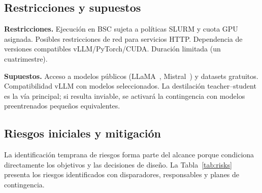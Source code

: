 \documentclass[11pt,a4paper]{article}
\begin{document}
\subsection{Restricciones y supuestos}

\textbf{Restricciones.} Ejecución en BSC sujeta a políticas SLURM y cuota GPU asignada. Posibles restricciones de red para servicios HTTP. Dependencia de versiones compatibles vLLM/PyTorch/CUDA. Duración limitada (un cuatrimestre).

\textbf{Supuestos.} Acceso a modelos públicos (LLaMA~\cite{touvron2023llama}, Mistral~\cite{jiang2023mistral}) y datasets gratuitos. Compatibilidad vLLM con modelos seleccionados. La destilación teacher--student es la vía principal; si resulta inviable, se activará la contingencia con modelos preentrenados pequeños equivalentes.

\subsection{Riesgos iniciales y mitigación}

La identificación temprana de riesgos forma parte del alcance porque condiciona directamente los objetivos y las decisiones de diseño. La Tabla~\ref{tab:risks} presenta los riesgos identificados con disparadores, responsables y planes de contingencia.
\end{document}
